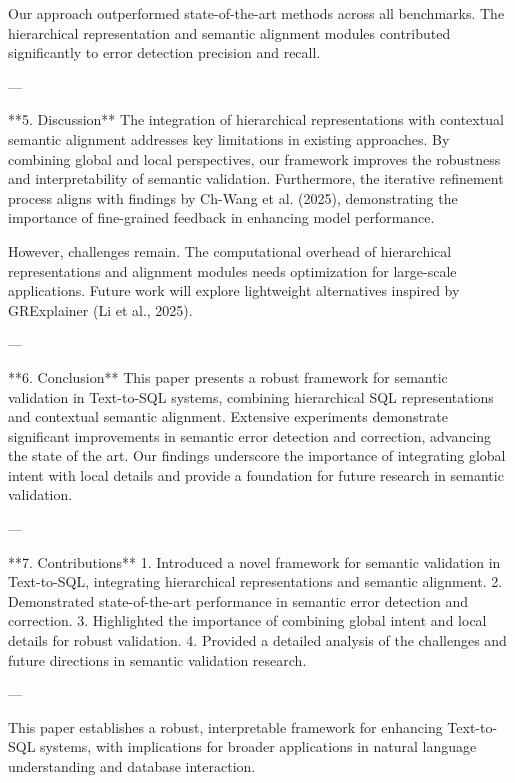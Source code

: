 Our approach outperformed state-of-the-art methods across all benchmarks. The hierarchical representation and semantic alignment modules contributed significantly to error detection precision and recall.  

---

**5. Discussion**  
The integration of hierarchical representations with contextual semantic alignment addresses key limitations in existing approaches. By combining global and local perspectives, our framework improves the robustness and interpretability of semantic validation. Furthermore, the iterative refinement process aligns with findings by Ch-Wang et al. (2025), demonstrating the importance of fine-grained feedback in enhancing model performance.  

However, challenges remain. The computational overhead of hierarchical representations and alignment modules needs optimization for large-scale applications. Future work will explore lightweight alternatives inspired by GRExplainer (Li et al., 2025).  

---

**6. Conclusion**  
This paper presents a robust framework for semantic validation in Text-to-SQL systems, combining hierarchical SQL representations and contextual semantic alignment. Extensive experiments demonstrate significant improvements in semantic error detection and correction, advancing the state of the art. Our findings underscore the importance of integrating global intent with local details and provide a foundation for future research in semantic validation.  

---

**7. Contributions**  
1. Introduced a novel framework for semantic validation in Text-to-SQL, integrating hierarchical representations and semantic alignment.  
2. Demonstrated state-of-the-art performance in semantic error detection and correction.  
3. Highlighted the importance of combining global intent and local details for robust validation.  
4. Provided a detailed analysis of the challenges and future directions in semantic validation research.  

--- 

This paper establishes a robust, interpretable framework for enhancing Text-to-SQL systems, with implications for broader applications in natural language understanding and database interaction.